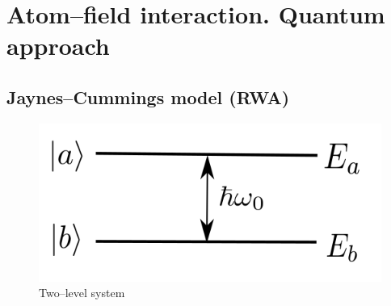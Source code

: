 \section{Atom--field interaction. Quantum approach}

\subsection{Jaynes–Cummings model (RWA)}

\begin{figure}[h!]
	\centering
	\includegraphics[width=0.3\linewidth]{fig/L6/2lvl}
	\caption{Two--level system}
	\label{fig:22lvl}
\end{figure}

